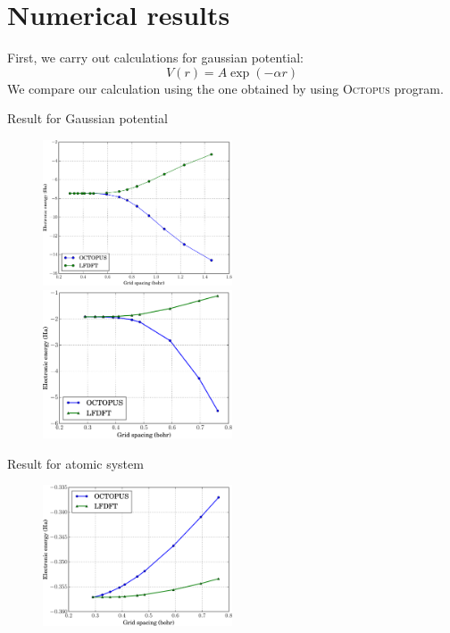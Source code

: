 \section{Numerical results}

First, we carry out calculations for gaussian potential:
\begin{equation}
V(r) = A\exp(-\alpha r)
\end{equation}
We compare our calculation using the one obtained by using \textsf{\textsc{Octopus}} program.

Result for Gaussian potential
\begin{figure}[h]
\includegraphics[width=0.5\textwidth]{images/A_10_alpha_1.pdf}
\includegraphics[width=0.5\textwidth]{images/A_10_alpha_3.pdf}
\end{figure}

Result for atomic system
\begin{figure}[h]
\includegraphics[width=0.5\textwidth]{images/atom_H.pdf}
\end{figure}


